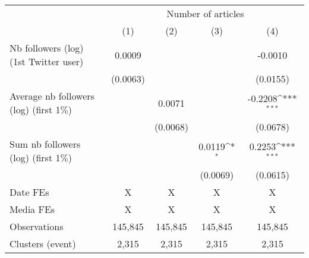 {
\def\sym#1{\ifmmode^{#1}\else\(^{#1}\)\fi}
\begin{tabular}{l*{4}{c}}
\hline\hline
                    &\multicolumn{4}{c}{Number of articles}                                                 \\\cmidrule(lr){2-5}
                    &\multicolumn{1}{c}{(1)}         &\multicolumn{1}{c}{(2)}         &\multicolumn{1}{c}{(3)}         &\multicolumn{1}{c}{(4)}         \\
\hline
Nb followers (log) (1st Twitter user)&      0.0009         &                     &                     &     -0.0010         \\
                    &    (0.0063)         &                     &                     &    (0.0155)         \\
Average nb followers (log) (first 1$\%$)&                     &      0.0071         &                     &     -0.2208\sym{***}\\
                    &                     &    (0.0068)         &                     &    (0.0678)         \\
Sum nb followers (log) (first 1$\%$)&                     &                     &      0.0119\sym{*}  &      0.2253\sym{***}\\
                    &                     &                     &    (0.0069)         &    (0.0615)         \\
\hline
Date FEs            &           X         &           X         &           X         &           X         \\
Media FEs           &           X         &           X         &           X         &           X         \\
Observations        &     145,845         &     145,845         &     145,845         &     145,845         \\
Clusters (event)    &       2,315         &       2,315         &       2,315         &       2,315         \\
\hline\hline
\end{tabular}
}
